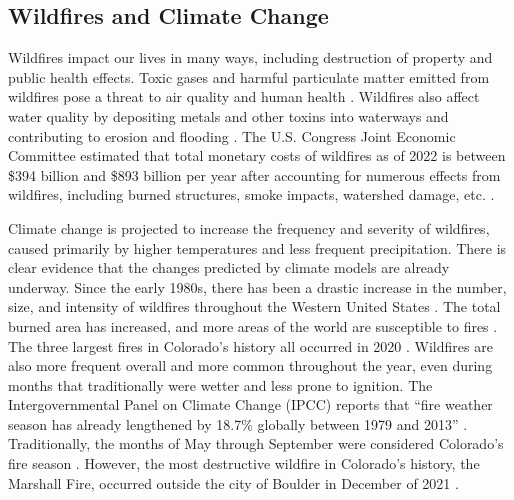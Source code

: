 \documentclass[11pt]{article}%
\begin{document}
\subsection{Wildfires and Climate Change}

Wildfires impact our lives in many ways, including destruction of property and public health effects. Toxic gases and harmful particulate matter emitted from wildfires pose a threat to air quality and human health \citep[e.g.,][]{WHO-2024-WFS}. Wildfires also affect water quality by depositing metals and other toxins into waterways and contributing to erosion and flooding \citep{USGS-2024-WQA}. The U.S. Congress Joint Economic Committee estimated that total monetary costs of wildfires as of 2022 is between \$394 billion and \$893 billion per year after accounting for numerous effects from wildfires, including burned structures, smoke impacts, watershed damage, etc. \citep{JEC-2023-CEW}.

Climate change is projected to increase the frequency and severity of wildfires, caused primarily by higher temperatures and less frequent precipitation. There is clear evidence that the changes predicted by climate models are already underway. Since the early 1980s, there has been a drastic increase in the number, size, and intensity of wildfires throughout the Western United States \citep{Cartier-2022-UFQ}. The total burned area has increased, and more areas of the world are susceptible to fires \citep{IPCC-2021-LCI}. The three largest fires in Colorado’s history all occurred in 2020 \citep{CDFPC-2024-HWI}. Wildfires are also more frequent overall and more common throughout the year, even during months that traditionally were wetter and less prone to ignition. The Intergovernmental Panel on Climate Change (IPCC) reports that “fire weather season has already lengthened by 18.7\% globally between 1979 and 2013” \citep{IPCC-2021-LCI}. Traditionally, the months of May through September were considered Colorado’s fire season \citep{WFCA-2023-CFS}. However, the most destructive wildfire in Colorado’s history, the Marshall Fire, occurred outside the city of Boulder in December of 2021 \citep{CDFPC-2024-HWI}.
\end{document}

